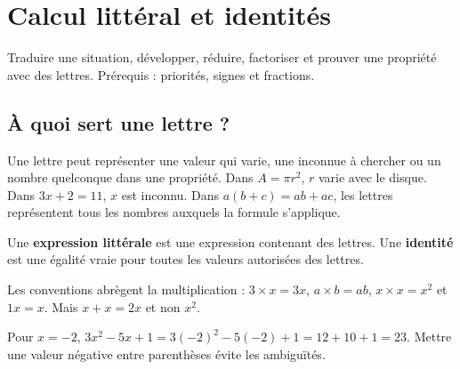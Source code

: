 \documentclass[../cours_3e.tex]{subfiles}
\begin{document}
\setcounter{chapter}{4}
\chapter{Calcul littéral et identités}
\label{ch:litteral}
\begin{objectif}
Traduire une situation, développer, réduire, factoriser et prouver une propriété avec des lettres. Prérequis : priorités, signes et fractions.
\end{objectif}
\section{À quoi sert une lettre ?}
Une lettre peut représenter une valeur qui varie, une inconnue à chercher ou un nombre quelconque dans une propriété. Dans $A=\pi r^2$, $r$ varie avec le disque. Dans $3x+2=11$, $x$ est inconnu. Dans $a(b+c)=ab+ac$, les lettres représentent tous les nombres auxquels la formule s'applique.
\begin{definition}
Une \textbf{expression littérale} est une expression contenant des lettres. Une \textbf{identité} est une égalité vraie pour toutes les valeurs autorisées des lettres.
\end{definition}
Les conventions abrègent la multiplication : $3\times x=3x$, $a\times b=ab$, $x\times x=x^2$ et $1x=x$. Mais $x+x=2x$ et non $x^2$.
\begin{exemple}[Substituer]
Pour $x=-2$, $3x^2-5x+1=3(-2)^2-5(-2)+1=12+10+1=23$. Mettre une valeur négative entre parenthèses évite les ambiguïtés.
\end{exemple}
\end{document}

